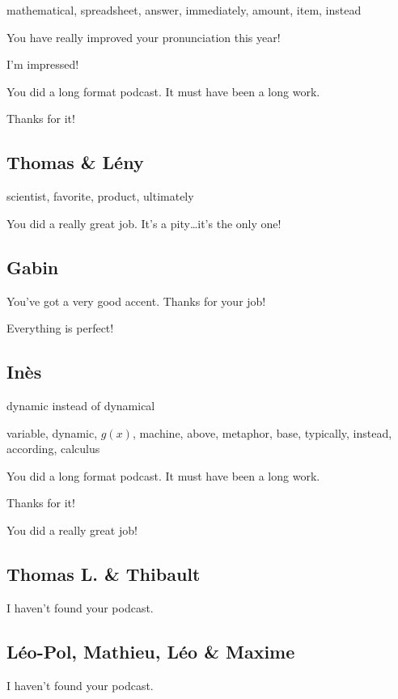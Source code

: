 \documentclass[12pt,oneside]{report}
\begin{document}
\begin{spacing}{1.2}
mathematical, spreadsheet, answer, immediately, amount, item, instead

\color{blue}
You have really improved your pronunciation this year!

I'm impressed!

You did a long format podcast. It must have been a long work.

Thanks for it!
\color{black}


\subsection*{Thomas \& Lény}

scientist, favorite, product, ultimately

\color{blue}
You did a really great job. It's a pity\dots it's the only one!
\color{black}

\subsection*{Gabin}

\color{blue}
You've got a very good accent. Thanks for your job!

Everything is perfect!
\color{black}

\subsection*{Inès}

\color{blue}
dynamic instead of dynamical
\color{black}

variable, dynamic, $g(x)$, machine, above, metaphor, base, typically, instead, according, calculus 

\color{blue}
You did a long format podcast. It must have been a long work.

Thanks for it!

You did a really great job!
\color{black}

\subsection*{Thomas L. \& Thibault}

\color{blue}
I haven't found your podcast.
\color{black}

\subsection*{Léo-Pol, Mathieu, Léo \& Maxime}

\color{blue}
I haven't found your podcast.
\color{black}


\end{spacing}
\end{document}
